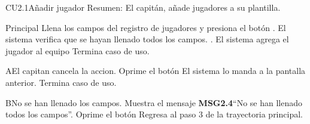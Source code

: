 

	\begin{UseCase}{CU2.1}{Añadir jugador}{
		Resumen: El capitán, añade jugadores a su plantilla.	}
	\end{UseCase}
	\newpage
	\begin{UCtrayectoria}{Principal}
	\UCpaso[\UCactor] Llena los campos del registro de jugadores y presiona el botón . 
	\UCpaso El sistema verifica que se hayan llenado todos los campos. .
	\UCpaso El sistema agrega el jugador al equipo
	 \UCpaso Termina caso de uso.
\end{UCtrayectoria}

	\begin{UCtrayectoriaA}{A}{El capitan cancela la accion.}
		\UCpaso[\UCactor] Oprime el botón 
		\UCpaso El sistema lo manda a la pantalla anterior.
   		\UCpaso Termina caso de uso.
	\end{UCtrayectoriaA}

	\begin{UCtrayectoriaA}{B}{No se han llenado los campos.}
		\UCpaso Muestra el mensaje {\bf MSG2.4}``No se han llenado todos los campos''.
		\UCpaso[\UCactor] Oprime el botón 
		\UCpaso[] Regresa al paso 3 de la trayectoria principal.
	\end{UCtrayectoriaA}
